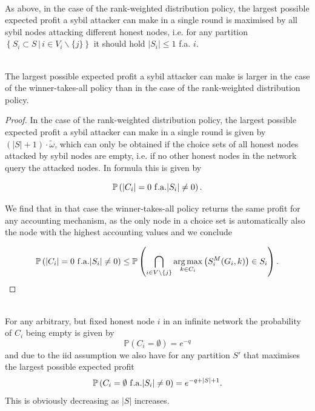 \begin{remark}[]\ \\
\label{rem:Sybil Strategy of the Rank-Weighted Distribution Policy}
\noindent{}As above, in the case of the rank-weighted distribution policy, the largest possible expected profit a sybil attacker can make in a single round is maximised by all sybil nodes attacking different honest nodes, i.e. for any partition $\left\lbrace{}S_i\subset{}S\,|\,i\in{}V_i\backslash\lbrace{}j\rbrace\right\rbrace$ it should hold $|S_i|\leq{}1$ f.a. $i$. \vspace{1em}\\
\end{remark}

\begin{proposition}[]\ \\
\label{prop:Largest Expected Profit Winner and Rank Distribution}
\noindent{}The largest possible expected profit a sybil attacker can make is larger in the case of the winner-takes-all policy than in the case of the rank-weighted distribution policy. 
\end{proposition}
\begin{proof}
\noindent{}In the case of the rank-weighted distribution policy, the largest possible expected profit a sybil attacker can make in a single round is given by $(|S|+1)\cdot{}\tilde{\omega}$, which can only be obtained if the choice sets of all honest nodes attacked by sybil nodes are empty, i.e. if no other honest nodes in the network query the attacked nodes. In formula this is given by 

\[
\mathbb{P}\left(|C_i|=0\,\,{\rm f.a. }|S_i|\neq{}0\right).
\]

\noindent{}We find that in that case the winner-takes-all policy returns the same profit for any accounting mechanism, as the only node in a choice set is automatically also the node with the highest accounting values and we conclude

\[
\mathbb{P}\left(|C_i|=0\,\,{\rm f.a. }|S_i|\neq{}0\right) \leq \mathbb{P}\left(\bigcap\limits_{i\in{}V\backslash\lbrace{}j\rbrace{}}\argmax\limits_{k\in{}C_i}\left(S_i^M(G_i,k)\right)\in{}S_i\right). \vspace{1em}\\
\]
\end{proof}

\begin{remark}[]\ \\
\label{rem:Probability of all empty sets}
For any arbitrary, but fixed honest node $i$ in an infinite network the probability of $C_i$ being empty is given by 
\[
\mathbb{P}\left(C_i=\emptyset\right) = e^{-q}
\]
\noindent{}and due to the iid assumption we also have for any partition $S'$ that maximises the largest possible expected profit
\[
\mathbb{P}\left(C_i=\emptyset\,\,{\rm f.a. }|S_i|\neq{}0\right) = e^{-q+|S|+1}.
\]
\noindent{}This is obviously decreasing as $|S|$ increases. \vspace{1em}\\
\end{remark}


